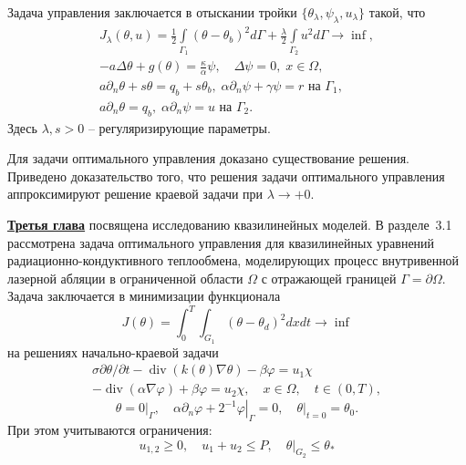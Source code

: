 Задача управления заключается
в отыскании тройки $\{\theta_\lambda,\psi_\lambda,u_\lambda\}$ такой, что
\begin{gather}
    \label{eq:2_4:cost}
    J_\lambda(\theta, u) =
    \frac{1}{2} \int \limits_{\Gamma_1} (\theta - \theta_b)^2 d \Gamma
    + \frac{\lambda}{2}\int\limits_{\Gamma_2} u^2 d\Gamma \rightarrow \inf, \\
    - a \Delta \theta + g (\theta) = \frac{\kappa}{\alpha}\psi, \quad
    \Delta \psi = 0, \; x \in \Omega, \\
    a \partial_n \theta + s \theta = q_b + s \theta_b,
    \; \alpha \partial_n \psi + \gamma \psi = r
    \text{ на } \Gamma_1,\\
    a \partial_n \theta = q_b, \;
    \alpha \partial_n \psi = u \text{ на } \Gamma_2.
\end{gather}
Здесь $\lambda, s > 0$ -- регуляризирующие параметры.


Для задачи оптимального управления доказано существование решения.
Приведено доказательство того, что решения задачи оптимального управления
аппроксимируют решение краевой задачи при $\lambda \rightarrow +0$.


\underline{\textbf{Третья глава}} посвящена исследованию квазилинейных моделей.
В разделе~3.1 рассмотрена задача оптимального управления для
квазилинейных уравнений радиационно-кондуктивного
теплообмена, моделирующих процесс внутривенной
лазерной абляции в ограниченной области $\Omega$ с отражающей границей $\Gamma=\partial\Omega$.
Задача заключается в минимизации функционала
\[ J(\theta)=\int_{0}^{T} \int_{G_{1}}\left(\theta-\theta_{d}\right)^{2} dx dt \rightarrow \inf \]
на решениях начально-краевой задачи
\begin{equation}
    \label{eq:3_2:1}
    \begin{gathered}
        \sigma \partial \theta / \partial t-\operatorname{div}(k(\theta)
        \nabla \theta)-\beta \varphi=u_{1} \chi \\
        -\operatorname{div}(\alpha \nabla \varphi)+\beta \varphi=u_{2}
        \chi, \quad x \in \Omega, \quad t \in(0, T),
    \end{gathered}
\end{equation}
\begin{equation}
    \label{eq:3_2:2}
    \theta=\left.0\right|_{\Gamma},
    \quad \alpha \partial_{n} \varphi
    +\left.2^{-1} \varphi\right|_{\Gamma}=0,
    \left.\quad \theta\right|_{t=0}=\theta_{0}.
\end{equation}
При этом учитываются ограничения:
\begin{equation}
    \label{eq:3_2:3}
    u_{1,2} \geq 0, \quad u_{1}+u_{2} \leq P, \left.\quad \theta\right|_{G_{2}} \leq \theta_{*}
\end{equation}


